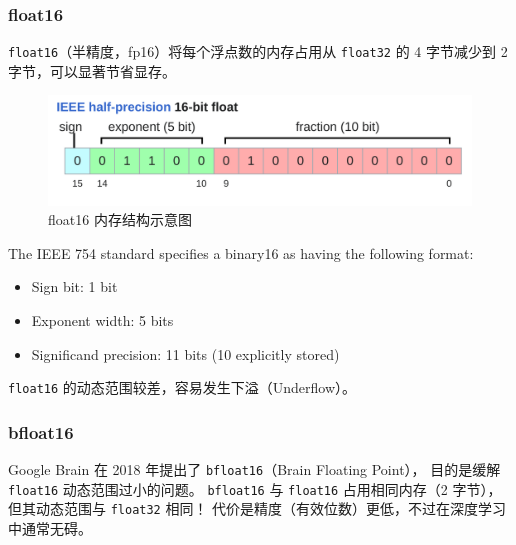 \clearpage
\subsubsection{float16}

\texttt{float16}（半精度，fp16）将每个浮点数的内存占用从 \texttt{float32} 的 4 字节减少到 2 字节，可以显著节省显存。

\begin{figure}[htbp]
  \centering
  \includegraphics[width=0.9\linewidth]{figs/lec2/lec2.29.png}
  \caption{float16 内存结构示意图}
  \label{fig:float16 内存结构示意图}
\end{figure}



The IEEE 754 standard specifies a binary16 as having the following format:
\begin{itemize}
  \item Sign bit: 1 bit
  \item Exponent width: 5 bits
  \item Significand precision: 11 bits (10 explicitly stored)
\end{itemize} 

\texttt{float16} 的动态范围较差，容易发生下溢（Underflow）。


\subsubsection{bfloat16}

Google Brain 在 2018 年提出了 \texttt{bfloat16}（Brain Floating Point），
目的是缓解 \texttt{float16} 动态范围过小的问题。
\texttt{bfloat16} 与 \texttt{float16} 占用相同内存（2 字节），
但其动态范围与 \texttt{float32} 相同！
代价是精度（有效位数）更低，不过在深度学习中通常无碍。

